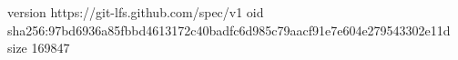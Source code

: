 version https://git-lfs.github.com/spec/v1
oid sha256:97bd6936a85fbbd4613172c40badfc6d985c79aacf91e7e604e279543302e11d
size 169847
